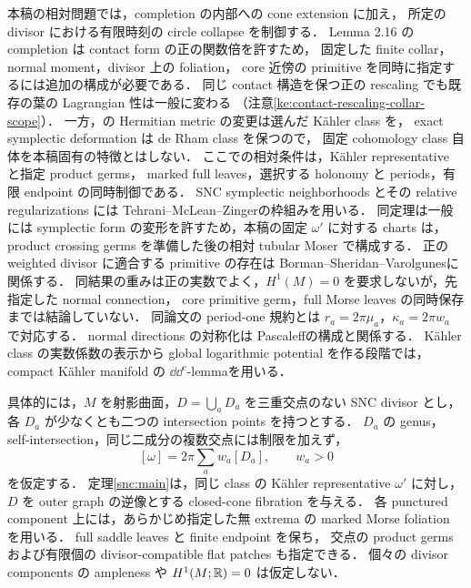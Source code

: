 本稿の相対問題では，completion の内部への cone extension に加え，
所定の divisor における有限時刻の circle collapse を制御する．
Lemma 2.16 の completion は contact form の正の関数倍を許すため，
固定した finite collar，normal moment，divisor 上の foliation，
core 近傍の primitive を同時に指定するには追加の構成が必要である．
同じ contact 構造を保つ正の rescaling でも既存の葉の Lagrangian 性は一般に変わる
（注意\ref{ke:contact-rescaling-collar-scope}）．
一方，\cite[\S\S2.3--2.4]{EM}の Hermitian metric の変更は選んだ Kähler class を，
exact symplectic deformation は de Rham class を保つので，
固定 cohomology class 自体を本稿固有の特徴とはしない．
ここでの相対条件は，Kähler representative と指定 product germs，
marked full leaves，選択する holonomy と periods，有限 endpoint の同時制御である．
SNC symplectic neighborhoods とその relative regularizations には
Tehrani--McLean--Zinger\cite[Definitions 2.11--2.12, Theorem 2.13]{TMZ}の枠組みを用いる．
同定理は一般には symplectic form の変形を許すため，本稿の固定 $\omega'$ に対する
charts は，product crossing germs を準備した後の相対 tubular Moser で構成する．
正の weighted divisor に適合する primitive の存在は
Borman--Sheridan--Varolgunes\cite[Propositions 2.7, 2.10]{BSV}に関係する．
同結果の重みは正の実数でよく，$H^1(M)=0$ を要求しないが，先指定した normal connection，
core primitive germ，full Morse leaves の同時保存までは結論していない．
同論文の period-one 規約とは $r_a=2\pi\mu_a$，$\kappa_a=2\pi w_a$ で対応する．
normal directions の対称化は Pascaleff\cite[\S4.2]{Pascaleff}の構成と関係する．
Kähler class の実数係数の表示から global logarithmic potential を作る段階では，
compact Kähler manifold の $\dd\dd^c$-lemma\cite[\S5]{DGMS}を用いる．

具体的には，$M$ を射影曲面，$D=\bigcup_aD_a$ を三重交点のない SNC divisor とし，
各 $D_a$ が少なくとも二つの intersection points を持つとする．
$D_a$ の genus，self-intersection，同じ二成分の複数交点には制限を加えず，
\[
 [\omega]=2\pi\sum_a w_a[D_a],\qquad w_a>0
\]
を仮定する．
定理\ref{snc:main}は，同じ class の Kähler representative $\omega'$ に対し，
$D$ を outer graph の逆像とする closed-cone fibration を与える．
各 punctured component 上には，あらかじめ指定した無 extrema の
marked Morse foliation を用いる．
full saddle leaves と finite endpoint を保ち，
交点の product germs および有限個の divisor-compatible flat patches も指定できる．
個々の divisor components の ampleness や $H^1(M;\mathbb R)=0$ は仮定しない．

